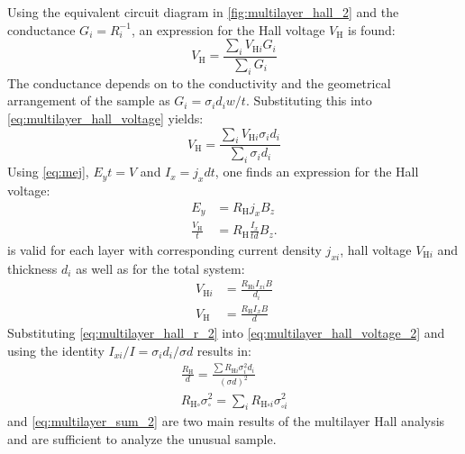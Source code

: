 Using the equivalent circuit diagram in \cref{fig:multilayer_hall_2} and the conductance
$G_i = R_i^{-1}$, an expression for the Hall voltage $V_{\mathrm{H}}$ is found:
\begin{equation}
	V_{\mathrm{H}}=\frac{\sum_{i}V_{\mathrm{H}i}G_{i}}{\sum_{i}G_{i}}
	\label{eq:multilayer_hall_voltage}
\end{equation}
The conductance depends on to the conductivity and the geometrical arrangement of the 
sample as $G_i = \sigma_i d_i w/ t$. Substituting this into 
\cref{eq:multilayer_hall_voltage} yields:
\begin{equation}
	V_{\mathrm{H}}=\frac{\sum_{i}V_{\mathrm{H}i}  
	\sigma_{i}d_{i}}{\sum_{i} \sigma_{i}d_{i}}
	\label{eq:multilayer_hall_voltage_2}
\end{equation}
Using \cref{eq:mej}, $E_y t = V$ and $I_x=j_x d t$, one finds an expression 
for the Hall voltage:
\begin{align}
	E_{y}&=R_{\mathrm{H}}j_{x}B_{z} \\
	\frac{V_{\mathrm{H}}}{t}&=R_{\mathrm{H}}\frac{I_{x}}{t d}B_{z}.
	\label{eq:multilayer_hall_r}
\end{align}
 is valid for each layer with corresponding current density
$j_{xi}$, hall voltage $V_{\mathrm{H}i}$ and thickness $d_i$ as well as for the total 
system:
\begin{align}
	V_{\mathrm{H}i} &= \frac{R_{\mathrm{H}i}I_{xi} B}{d_{i}} \\
	V_{\mathrm{H}}&=\frac{R_{\mathrm{H}}I_{x}B}{d}
	\label{eq:multilayer_hall_r_2}
\end{align}
Substituting \cref{eq:multilayer_hall_r_2} into \cref{eq:multilayer_hall_voltage_2} and
using the identity $I_{xi} /I=\sigma_{i}d_{i} /\sigma d$ results in:
\begin{align}
	\frac{R_{\mathrm{H}}}{d}=\frac{\sum R_{\mathrm{H}i} \sigma_{i}^{2} d_{i}}
	{(\sigma d)^2} \\
	R_{\mathrm{H \square}}\sigma_{\square}^2=\sum_{i}R_{\mathrm{H}\square i} 
	\sigma_{\square i}^{2}
	\label{eq:multilayer_sum_2}
\end{align}
 and \cref{eq:multilayer_sum_2} are two main results of the 
multilayer Hall analysis and are sufficient to analyze the unusual  sample.